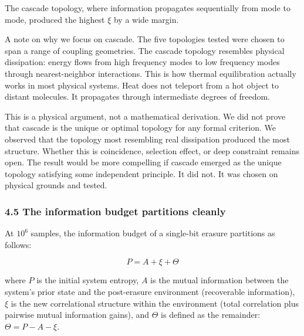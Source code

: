 \documentclass[
  11pt,
  a4paper]{article}
\begin{document}
The cascade topology, where information propagates sequentially from
mode to mode, produced the highest \(\xi\) by a wide margin.

A note on why we focus on cascade. The five topologies tested were
chosen to span a range of coupling geometries. The cascade topology
resembles physical dissipation: energy flows from high frequency modes
to low frequency modes through nearest-neighbor interactions. This is
how thermal equilibration actually works in most physical systems. Heat
does not teleport from a hot object to distant molecules. It propagates
through intermediate degrees of freedom.

This is a physical argument, not a mathematical derivation. We did not
prove that cascade is the unique or optimal topology for any formal
criterion. We observed that the topology most resembling real
dissipation produced the most structure. Whether this is coincidence,
selection effect, or deep constraint remains open. The result would be
more compelling if cascade emerged as the unique topology satisfying
some independent principle. It did not. It was chosen on physical
grounds and tested.

\subsubsection{4.5 The information budget partitions
cleanly}\label{the-information-budget-partitions-cleanly}

At \(10^6\) samples, the information budget of a single-bit erasure
partitions as follows:

\[P = A + \xi + \Theta\]

where \(P\) is the initial system entropy, \(A\) is the mutual
information between the system's prior state and the post-erasure
environment (recoverable information), \(\xi\) is the new correlational
structure within the environment (total correlation plus pairwise mutual
information gains), and \(\Theta\) is defined as the remainder:
\(\Theta = P - A - \xi\).
\end{document}
